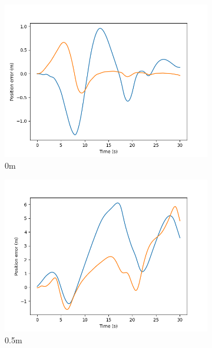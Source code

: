 \documentclass[class=article, crop=false]{standalone}
\begin{document}
\begin{figure}
    \centering
    \begin{subfigure}[b]{0.48\textwidth}
        \centering
        \includegraphics{scenario1/rov-100m/0.0m/usv_pos_error_controlled}
        \caption{0m}
        \label{}
    \end{subfigure}
    \hfill
        \begin{subfigure}[b]{0.48\textwidth}
        \centering
        \includegraphics{scenario1/rov-100m/0.5m/usv_pos_error_controlled}
        \caption{0.5m}
        \label{}
    \end{subfigure}
    \vfill
        \begin{subfigure}[b]{0.48\textwidth}
        \centering

\end{subfigure}
\end{figure}
\end{document}
